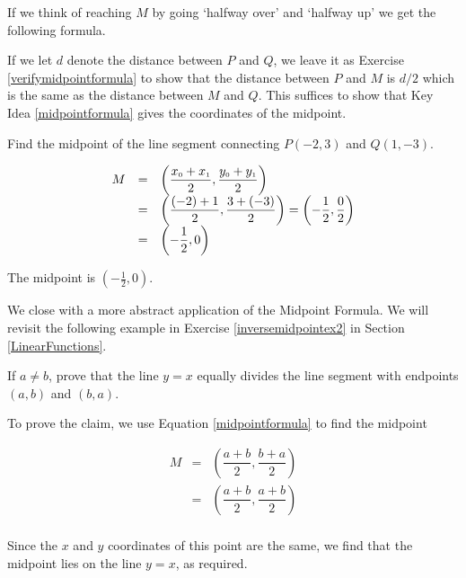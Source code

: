 If we think of reaching $M$ by going `halfway over' and `halfway up' we get the following formula. 

\medskip


\medskip

If we let $d$ denote the distance between $P$ and $Q$, we leave it as Exercise \ref{verifymidpointformula} to show that the distance between $P$ and $M$ is $d/2$ which is the same as the distance between $M$ and $Q$.  This suffices to show that Key Idea \ref{midpointformula} gives the coordinates of the midpoint.

\medskip

{
Find the midpoint of the line segment connecting $P(-2,3)$ and  $Q(1,-3)$.  
}
{
\setlength{\extrarowheight}{10pt}

\[ \begin{array}{rcl}
 M & = & \left( \dfrac{x_{\mbox{\tiny$0$}}+x_{\mbox{\tiny$1$}}}{2},  \dfrac{y_{\mbox{\tiny$0$}}+y_{\mbox{\tiny$1$}}}{2} \right) \\
   & = & \left( \dfrac{(-2)+1}{2},  \dfrac{3+(-3)}{2} \right)  = \left(- \dfrac{1}{2}, \dfrac{0}{2} \right) \\
   & = & \left(- \dfrac{1}{2}, 0 \right) 
   \end{array} \]
   
The midpoint is  $\left(- \frac{1}{2}, 0 \right)$.}

\medskip


\label{inversemidpoint}

We close with a more abstract application of the Midpoint Formula.  We will revisit the following example in Exercise \ref{inversemidpointex2} in Section \ref{LinearFunctions}.  

\medskip

{
If $a \neq b$, prove that the line $y = x$ equally divides the line segment with endpoints $(a,b)$ and $(b,a)$.
}
{
To prove the claim, we use Equation \ref{midpointformula} to find the midpoint  


\[ \begin{array}{rcl}

 M & = & \left( \dfrac{a+b}{2},  \dfrac{b+a}{2} \right) \\
   & = & \left( \dfrac{a+b}{2},  \dfrac{a+b}{2} \right)  \\ \end{array} \]

Since the $x$ and $y$ coordinates of this point are the same, we find that the midpoint lies on the line $y=x$, as required. 
}

{}
